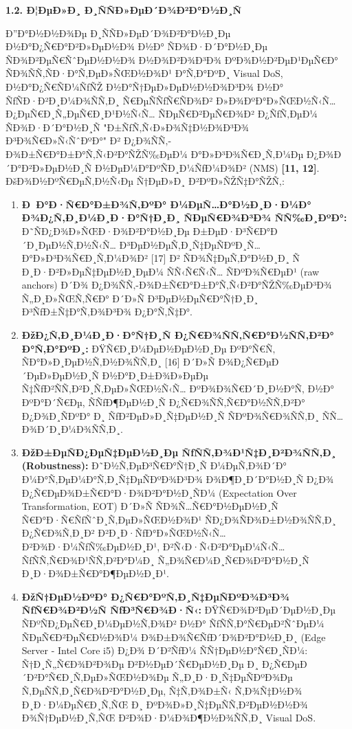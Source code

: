 \documentclass[]{article}
\begin{document}
\textbf{1.2. Ð¦ÐµÐ»Ð¸ Ð¸ÑÑÐ»ÐµÐ´Ð¾Ð²Ð°Ð½Ð¸Ñ}

Ð”Ð°Ð½Ð½Ð¾Ðµ Ð¸ÑÑÐ»ÐµÐ´Ð¾Ð²Ð°Ð½Ð¸Ðµ Ð½Ð°Ð¿Ñ€Ð°Ð²Ð»ÐµÐ½Ð¾ Ð½Ð° ÑÐ¾Ð·Ð´Ð°Ð½Ð¸Ðµ ÑÐ¾Ð²ÐµÑ€ÑˆÐµÐ½Ð½Ð¾ Ð½Ð¾Ð²Ð¾Ð³Ð¾ ÐºÐ¾Ð½Ð²ÐµÐ¹ÐµÑ€Ð° ÑÐ¾ÑÑ‚ÑÐ·Ð°Ñ‚ÐµÐ»ÑŒÐ½Ð¾Ð¹ Ð°Ñ‚Ð°ÐºÐ¸ Visual DoS, Ð½Ð°Ð¿Ñ€ÑÐ¼ÑƒÑŽ Ð½Ð°Ñ†ÐµÐ»ÐµÐ½Ð½Ð¾Ð³Ð¾ Ð½Ð° ÑƒÑÐ·Ð²Ð¸Ð¼Ð¾ÑÑ‚Ð¸ Ñ€ÐµÑÑƒÑ€ÑÐ¾Ð² Ð»Ð¾ÐºÐ°Ð»ÑŒÐ½Ñ‹Ñ… Ð¿ÐµÑ€Ð¸Ñ„ÐµÑ€Ð¸Ð¹Ð½Ñ‹Ñ… ÑÐµÑ€Ð²ÐµÑ€Ð¾Ð² Ð¿ÑƒÑ‚ÐµÐ¼ ÑÐ¾Ð·Ð´Ð°Ð½Ð¸Ñ "Ð±ÑƒÑ‚Ñ‹Ð»Ð¾Ñ‡Ð½Ð¾Ð³Ð¾ Ð³Ð¾Ñ€Ð»Ñ‹ÑˆÐºÐ°" Ð² Ð¿Ð¾ÑÑ‚-Ð¾Ð±Ñ€Ð°Ð±Ð°Ñ‚Ñ‹Ð²Ð°ÑŽÑ‰ÐµÐ¼ Ð°Ð»Ð³Ð¾Ñ€Ð¸Ñ‚Ð¼Ðµ Ð¿Ð¾Ð´Ð°Ð²Ð»ÐµÐ½Ð¸Ñ Ð½ÐµÐ¼Ð°ÐºÑÐ¸Ð¼ÑƒÐ¼Ð¾Ð² (NMS) \textbf{{[}11, 12{]}}. ÐšÐ¾Ð½ÐºÑ€ÐµÑ‚Ð½Ñ‹Ðµ Ñ†ÐµÐ»Ð¸ Ð²ÐºÐ»ÑŽÑ‡Ð°ÑŽÑ‚:

\begin{enumerate}
\def\labelenumi{\arabic{enumi}.}
\item
  \textbf{Ð Ð°Ð·Ñ€Ð°Ð±Ð¾Ñ‚ÐºÐ° Ð¼ÐµÑ…Ð°Ð½Ð¸Ð·Ð¼Ð° Ð¾Ð¿Ñ‚Ð¸Ð¼Ð¸Ð·Ð°Ñ†Ð¸Ð¸ ÑÐµÑ€Ð¾Ð³Ð¾ ÑÑ‰Ð¸ÐºÐ°:} Ð˜ÑÐ¿Ð¾Ð»ÑŒÐ·Ð¾Ð²Ð°Ð½Ð¸Ðµ Ð±ÐµÐ·Ð³Ñ€Ð°Ð´Ð¸ÐµÐ½Ñ‚Ð½Ñ‹Ñ… Ð³ÐµÐ½ÐµÑ‚Ð¸Ñ‡ÐµÑÐºÐ¸Ñ… Ð°Ð»Ð³Ð¾Ñ€Ð¸Ñ‚Ð¼Ð¾Ð² {[}17{]} Ð² ÑÐ¾Ñ‡ÐµÑ‚Ð°Ð½Ð¸Ð¸ Ñ Ð¸Ð·Ð²Ð»ÐµÑ‡ÐµÐ½Ð¸ÐµÐ¼ ÑÑ‹Ñ€Ñ‹Ñ… ÑÐºÐ¾Ñ€ÐµÐ¹ (raw anchors) Ð´Ð¾ Ð¿Ð¾ÑÑ‚-Ð¾Ð±Ñ€Ð°Ð±Ð°Ñ‚Ñ‹Ð²Ð°ÑŽÑ‰ÐµÐ³Ð¾ Ñ„Ð¸Ð»ÑŒÑ‚Ñ€Ð° Ð´Ð»Ñ Ð³ÐµÐ½ÐµÑ€Ð°Ñ†Ð¸Ð¸ Ð³ÑƒÐ±Ñ‡Ð°Ñ‚Ð¾Ð³Ð¾ Ð¿Ð°Ñ‚Ñ‡Ð°.
\item
  \textbf{ÐžÐ¿Ñ‚Ð¸Ð¼Ð¸Ð·Ð°Ñ†Ð¸Ñ Ð¿Ñ€Ð¾ÑÑ‚Ñ€Ð°Ð½ÑÑ‚Ð²Ð° Ð°Ñ‚Ð°ÐºÐ¸:} ÐŸÑ€Ð¸Ð¼ÐµÐ½ÐµÐ½Ð¸Ðµ ÐºÐ°Ñ€Ñ‚ ÑÐ°Ð»Ð¸ÐµÐ½Ñ‚Ð½Ð¾ÑÑ‚Ð¸ {[}16{]} Ð´Ð»Ñ Ð¾Ð¿Ñ€ÐµÐ´ÐµÐ»ÐµÐ½Ð¸Ñ Ð½Ð°Ð¸Ð±Ð¾Ð»ÐµÐµ Ñ‡ÑƒÐ²ÑÑ‚Ð²Ð¸Ñ‚ÐµÐ»ÑŒÐ½Ñ‹Ñ… ÐºÐ¾Ð¾Ñ€Ð´Ð¸Ð½Ð°Ñ‚ Ð½Ð° ÐºÐ°Ð´Ñ€Ðµ, ÑÑƒÐ¶ÐµÐ½Ð¸Ñ Ð¿Ñ€Ð¾ÑÑ‚Ñ€Ð°Ð½ÑÑ‚Ð²Ð° Ð¿Ð¾Ð¸ÑÐºÐ° Ð¸ ÑƒÐ²ÐµÐ»Ð¸Ñ‡ÐµÐ½Ð¸Ñ ÑÐºÐ¾Ñ€Ð¾ÑÑ‚Ð¸ ÑÑ…Ð¾Ð´Ð¸Ð¼Ð¾ÑÑ‚Ð¸.
\item
  \textbf{ÐžÐ±ÐµÑÐ¿ÐµÑ‡ÐµÐ½Ð¸Ðµ ÑƒÑÑ‚Ð¾Ð¹Ñ‡Ð¸Ð²Ð¾ÑÑ‚Ð¸ (Robustness):} Ð˜Ð½Ñ‚ÐµÐ³Ñ€Ð°Ñ†Ð¸Ñ Ð¼ÐµÑ‚Ð¾Ð´Ð° Ð¼Ð°Ñ‚ÐµÐ¼Ð°Ñ‚Ð¸Ñ‡ÐµÑÐºÐ¾Ð³Ð¾ Ð¾Ð¶Ð¸Ð´Ð°Ð½Ð¸Ñ Ð¿Ð¾ Ð¿Ñ€ÐµÐ¾Ð±Ñ€Ð°Ð·Ð¾Ð²Ð°Ð½Ð¸ÑÐ¼ (Expectation Over Transformation, EOT) Ð´Ð»Ñ ÑÐ¾Ñ…Ñ€Ð°Ð½ÐµÐ½Ð¸Ñ Ñ€Ð°Ð·Ñ€ÑƒÑˆÐ¸Ñ‚ÐµÐ»ÑŒÐ½Ð¾Ð¹ ÑÐ¿Ð¾ÑÐ¾Ð±Ð½Ð¾ÑÑ‚Ð¸ Ð¿Ñ€Ð¾Ñ‚Ð¸Ð² Ð²Ð¸Ð·ÑƒÐ°Ð»ÑŒÐ½Ñ‹Ñ… Ð²Ð¾Ð·Ð¼ÑƒÑ‰ÐµÐ½Ð¸Ð¹, Ð²Ñ‹Ð·Ñ‹Ð²Ð°ÐµÐ¼Ñ‹Ñ… ÑƒÑÑ‚Ñ€Ð¾Ð¹ÑÑ‚Ð²Ð°Ð¼Ð¸ Ñ„Ð¾Ñ€Ð¼Ð¸Ñ€Ð¾Ð²Ð°Ð½Ð¸Ñ Ð¸Ð·Ð¾Ð±Ñ€Ð°Ð¶ÐµÐ½Ð¸Ð¹.
\item
  \textbf{ÐžÑ†ÐµÐ½ÐºÐ° Ð¿Ñ€Ð°ÐºÑ‚Ð¸Ñ‡ÐµÑÐºÐ¾Ð³Ð¾ ÑƒÑ€Ð¾Ð²Ð½Ñ ÑƒÐ³Ñ€Ð¾Ð·Ñ‹:} ÐŸÑ€Ð¾Ð²ÐµÐ´ÐµÐ½Ð¸Ðµ ÑÐºÑÐ¿ÐµÑ€Ð¸Ð¼ÐµÐ½Ñ‚Ð¾Ð² Ð½Ð° ÑƒÑÑ‚Ð°Ñ€ÐµÐ²ÑˆÐµÐ¼ ÑÐµÑ€Ð²ÐµÑ€Ð½Ð¾Ð¼ Ð¾Ð±Ð¾Ñ€ÑƒÐ´Ð¾Ð²Ð°Ð½Ð¸Ð¸ (Edge Server - Intel Core i5) Ð¿Ð¾ Ð´Ð²ÑƒÐ¼ ÑÑ†ÐµÐ½Ð°Ñ€Ð¸ÑÐ¼: Ñ†Ð¸Ñ„Ñ€Ð¾Ð²Ð¾Ðµ Ð²Ð½ÐµÐ´Ñ€ÐµÐ½Ð¸Ðµ Ð¸ Ð¿Ñ€ÐµÐ´Ð²Ð°Ñ€Ð¸Ñ‚ÐµÐ»ÑŒÐ½Ð¾Ðµ Ñ„Ð¸Ð·Ð¸Ñ‡ÐµÑÐºÐ¾Ðµ Ñ‚ÐµÑÑ‚Ð¸Ñ€Ð¾Ð²Ð°Ð½Ð¸Ðµ, Ñ‡Ñ‚Ð¾Ð±Ñ‹ Ñ‚Ð¾Ñ‡Ð½Ð¾ Ð¸Ð·Ð¼ÐµÑ€Ð¸Ñ‚ÑŒ Ð¸ ÐºÐ¾Ð»Ð¸Ñ‡ÐµÑÑ‚Ð²ÐµÐ½Ð½Ð¾ Ð¾Ñ†ÐµÐ½Ð¸Ñ‚ÑŒ Ð²Ð¾Ð·Ð¼Ð¾Ð¶Ð½Ð¾ÑÑ‚Ð¸ Visual DoS.
\end{enumerate}
\end{document}
